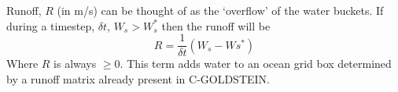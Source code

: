 \documentclass[10pt,a4paper]{report}
\begin{document}

Runoff, $R$ (in m/s) can be thought of as the `overflow' of the
water buckets. If during a timestep, $\delta t$, $W_s>W_{s}^*$
then the runoff will be
\begin{equation}
R=\frac{1}{\delta t}(W_{s}-W{s}^*)
\end{equation}
Where $R$ is always $\geq 0$. This term adds water to an ocean
grid box determined by a runoff matrix already present in
C-GOLDSTEIN.

\end{document}
